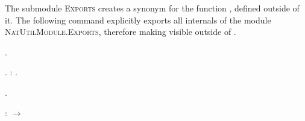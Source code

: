 The submodule \textsc{Exports} creates a synonym  for the
function , defined outside of it. The following command
explicitly exports all internals of the module
\textsc{NatUtilModule.Exports}, therefore making  visible
outside of .


 \begin{coqdoccode}
\coqdocemptyline
\coqdocnoindent
{} .\coqdoceol
\coqdocemptyline
\end{coqdoccode}


\coqdoceol
\coqdocemptyline
\coqdocnoindent
{} .\coqdoceol
\coqdocnoindent
\coqdoceol
\coqdocnoindent
{}:          .

\coqdocemptyline
\begin{coqdoccode}
\coqdocemptyline
\coqdocnoindent
{} .\coqdoceol
\coqdocemptyline
\end{coqdoccode}
\coqdoceol
\coqdocemptyline
\coqdocnoindent
{}\coqdoceol
\coqdocindent{2.50em}
:  \ensuremath{\rightarrow} 

\coqdocemptyline
\begin{coqdoccode}
\end{coqdoccode}
